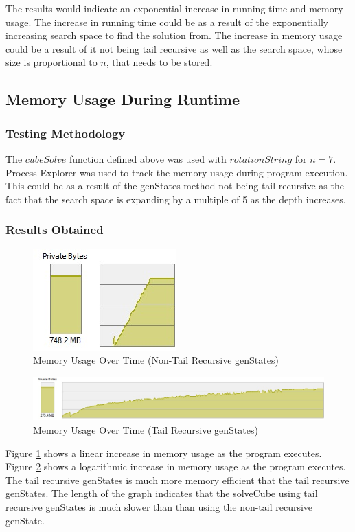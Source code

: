 \documentclass[]{article}
\begin{document}
 The results would indicate an exponential increase in running time and memory usage. The increase in running time could be as a result of the exponentially increasing search space to find the solution from. The increase in memory usage could be a result of it not being tail recursive as well as the search space, whose size is proportional to \(n\), that needs to be stored. 
 
 \subsection{Memory Usage During Runtime}
 \subsubsection{Testing Methodology}
 The \(cubeSolve\) function defined above was used with \(rotationString\) for \(n = 7\). Process Explorer was used to track the memory usage during program execution. This could be as a result of the genStates method not being tail recursive as the fact that the search space is expanding by a multiple of 5 as the depth increases.
 \subsubsection*{Results Obtained}
 
 \begin{figure}[H]
 	\centering
 	\includegraphics[width=0.4\linewidth]{mem_usage2.jpg}
 	\caption{Memory Usage Over Time (Non-Tail Recursive genStates)}
 	\label{fig:memory_usage}
 \end{figure}
  \begin{figure}[H]
  	\centering
  	\includegraphics[width=1.2\linewidth]{mem_usage3.jpg}
  	\caption{Memory Usage Over Time (Tail Recursive genStates)}
  	\label{fig:memory_usageTail}
  \end{figure}
 Figure \ref{fig:memory_usage} shows a linear increase in memory usage as the program executes. Figure \ref{fig:memory_usageTail} shows a logarithmic increase in memory usage as the program executes. The tail recursive genStates is much more memory efficient that the tail recursive genStates. The length of the graph indicates that the solveCube using tail recursive genStates is much slower than than using the non-tail recursive genState. 
\end{document}
